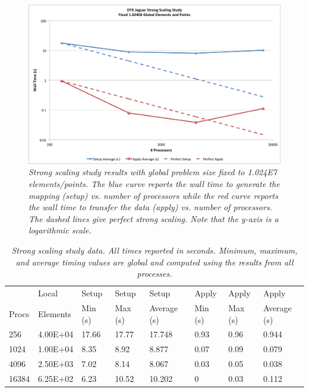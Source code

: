 \documentclass{mc2013}
\begin{document}
\begin{figure}[htpb!]
  \centering
  \includegraphics[width=5.5in]{StrongScaling.png}
  \caption{\sl Strong scaling study results with global problem size
    fixed to 1.024E7 elements/points. The blue curve reports the wall
    time to generate the mapping (setup) vs. number of processors
    while the red curve reports the wall time to transfer the data
    (apply) vs. number of processors. The dashed lines give perfect
    strong scaling. Note that the y-axis is a logarithmic scale. }
  \label{fig:strong_scaling}
\end{figure}

\begin{table}[htpb!]
  \begin{center}
    \begin{tabular}{llllllll}\hline\hline
      \multicolumn{1}{l}{}& 
      \multicolumn{1}{l}{Local} & 
      \multicolumn{1}{l}{Setup} & 
      \multicolumn{1}{l}{Setup} & 
      \multicolumn{1}{l}{Setup} & 
      \multicolumn{1}{l}{Apply} & 
      \multicolumn{1}{l}{Apply} & 
      \multicolumn{1}{l}{Apply}\\
      \multicolumn{1}{l}{Procs} & 
      \multicolumn{1}{l}{Elements} & 
      \multicolumn{1}{l}{Min (s)} & 
      \multicolumn{1}{l}{Max (s)} & 
      \multicolumn{1}{l}{Average (s)} & 
      \multicolumn{1}{l}{Min (s)} & 
      \multicolumn{1}{l}{Max (s)} & 
      \multicolumn{1}{l}{Average (s)}\\ \hline\hline
256 &	4.00E+04 & 17.66 &	17.77 &	17.748 & 0.93 &	0.96 &	0.944 \\
1024 &	1.00E+04 & 8.35 &	8.92 &	8.877 &	0.07 &	0.09 &	0.079 \\
4096 &	2.50E+03 & 7.02 &	8.14 &	8.067 &	0.03 &	0.05 &	0.038 \\
16384 &	6.25E+02 & 6.23 &	10.52 &	10.202 & 0 &	0.03 &	0.112 \\
      \hline\hline
    \end{tabular}
  \end{center}
  \caption{\sl Strong scaling study data. All times reported in
    seconds. Minimum, maximum, and average timing values are global
    and computed using the results from all processes.}
  \label{tab:strong_scaling}
\end{table}
\end{document}
